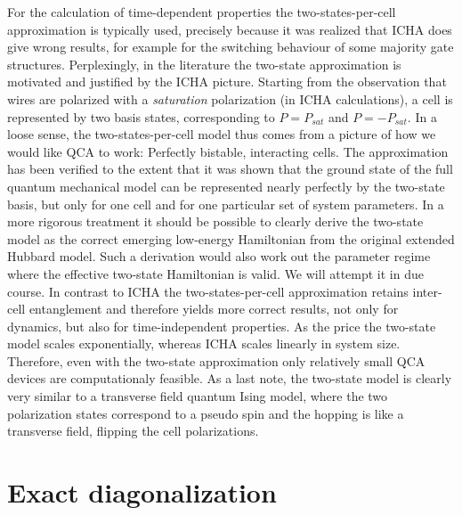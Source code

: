 For the calculation of time-dependent properties the two-states-per-cell
approximation is typically used, precisely because it was realized that ICHA
does give wrong results, for example for the switching behaviour of some
majority gate structures. Perplexingly, in the literature the two-state
approximation is motivated and justified by the ICHA picture.  Starting from the
observation that wires are polarized with a \emph{saturation} polarization (in
ICHA calculations), a cell is represented by two basis states, corresponding to
$P = P_{sat}$ and $P = - P_{sat}$. In a loose sense, the two-states-per-cell
model thus comes from a picture of how we would like QCA to work: Perfectly
bistable, interacting cells. The approximation has been verified to the extent
that it was shown that the ground state of the full quantum mechanical model can
be represented nearly perfectly by the two-state basis, but only for one cell
and for one particular set of system parameters. In a more rigorous treatment it
should be possible to clearly derive the two-state model as the correct emerging
low-energy Hamiltonian from the original extended Hubbard model. Such a
derivation would also work out the parameter regime where the effective
two-state Hamiltonian is valid. We will attempt it in due course. In contrast to
ICHA the two-states-per-cell approximation retains inter-cell entanglement and
therefore yields more correct results, not only for dynamics, but also for
time-independent properties. As the price the two-state model scales
exponentially, whereas ICHA scales linearly in system size.  Therefore, even
with the two-state approximation only relatively small QCA devices are
computationaly feasible. As a last note, the two-state model is clearly very
similar to a transverse field quantum Ising model, where the two polarization
states correspond to a pseudo spin and the hopping is like a transverse field,
flipping the cell polarizations.


\section{Exact diagonalization}

